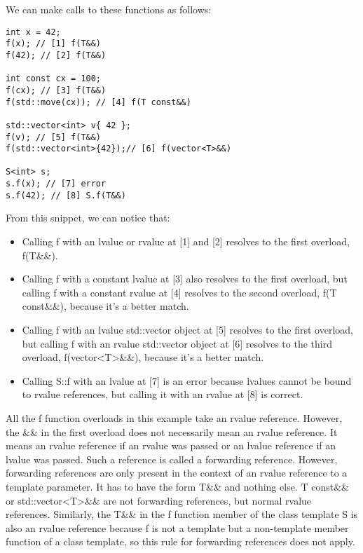 We can make calls to these functions as follows:

\begin{lstlisting}[style=styleCXX]
int x = 42;
f(x); // [1] f(T&&)
f(42); // [2] f(T&&)

int const cx = 100;
f(cx); // [3] f(T&&)
f(std::move(cx)); // [4] f(T const&&)

std::vector<int> v{ 42 };
f(v); // [5] f(T&&)
f(std::vector<int>{42});// [6] f(vector<T>&&)

S<int> s;
s.f(x); // [7] error
s.f(42); // [8] S.f(T&&)
\end{lstlisting}

From this snippet, we can notice that:

\begin{itemize}
\item
Calling f with an lvalue or rvalue at [1] and [2] resolves to the first overload, f(T\&\&).

\item
Calling f with a constant lvalue at [3] also resolves to the first overload, but calling f with a constant rvalue at [4] resolves to the second overload, f(T const\&\&), because it’s a better match.

\item
Calling f with an lvalue std::vector object at [5] resolves to the first overload, but calling f with an rvalue std::vector object at [6] resolves to the third overload, f(vector<T>\&\&), because it’s a better match.

\item
Calling S::f with an lvalue at [7] is an error because lvalues cannot be bound to rvalue references, but calling it with an rvalue at [8] is correct.
\end{itemize}

All the f function overloads in this example take an rvalue reference. However, the \&\& in the first overload does not necessarily mean an rvalue reference. It means an rvalue reference if an rvalue was passed or an lvalue reference if an lvalue was passed. Such a reference is called a forwarding reference. However, forwarding references are only present in the context of an rvalue reference to a template parameter. It has to have the form T\&\& and nothing else. T const\&\& or std::vector<T>\&\& are not forwarding references, but normal rvalue references. Similarly, the T\&\& in the f function member of the class template S is also an rvalue reference because f is not a template but a non-template member function of a class template, so this rule for forwarding references does not apply.

